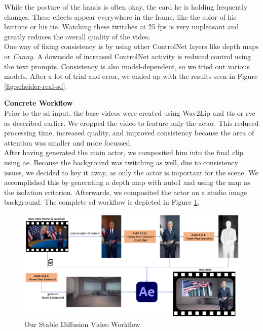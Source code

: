 \documentclass[
  a4paper,  %
  twoside,  %
  bibliography=totoc,
  headsepline,
  cleardoublepage=empty,
  parskip=half,
  draft=false
]{scrbook}
\begin{document}
While the posture of the hands is often okay, the card he is holding frequently changes. These effects appear everywhere in the frame, like the color of his buttons or his tie. Watching these twitches at 25 \gls{fps} is very unpleasant and greatly reduces the overall quality of the video. \\
One way of fixing consistency is by using other ControlNet layers like depth maps or \textit{Canny}. A downside of increased ControlNet activity is reduced control using the text prompts. Consistency is also model-dependent, so we tried out various models. After a lot of trial and error, we ended up with the results seen in Figure \ref{fig:scheider-real-sd}.

\textbf{Concrete Workflow} \\
Prior to the \gls{sd} input, the base videos were created using Wav2Lip and \gls{tts} or \gls{rvc} as described earlier. We cropped the video to feature only the actor. This reduced processing time, increased quality, and improved consistency because the area of attention was smaller and more focussed. \\
After having generated the main actor, we composited him into the final clip using \gls{ae}. Because the background was  twitching as well, due to consistency issues, we decided to key it away, as only the actor is important for the scene. We accomplished this by generating a depth map with \gls{auto1} and using the map as the isolation criterion. Afterwards, we composited the actor on a studio image background. The complete \gls{sd} workflow is depicted in Figure \ref{fig:sd-full-workflow}. 

\begin{figure}[h]
  \centering
  \includegraphics[width=1\textwidth]{./graphics/diffusion/sd-workflow.png}
  \caption{Our Stable Diffusion Video Workflow}
  \label{fig:sd-full-workflow}
\end{figure}
\end{document}

